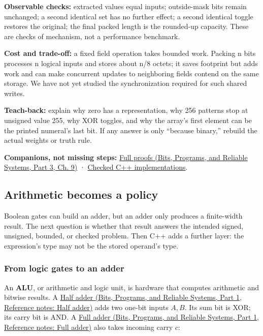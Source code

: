 \textbf{Observable checks:} extracted values equal inputs; outside-mask bits remain unchanged; a second identical set has no further effect; a second identical toggle restores the original; the final packed length is the rounded-up capacity. These are checks of mechanism, not a performance benchmark.

\textbf{Cost and trade-off:} a fixed field operation takes bounded work. Packing n bits processes n logical inputs and stores about n/8 octets; it saves footprint but adds work and can make concurrent updates to neighboring fields contend on the same storage. We have not yet studied the synchronization required for such shared writes.

\textbf{Teach-back:} explain why zero has a representation, why 256 patterns stop at unsigned value 255, why XOR toggles, and why the array's first element can be the printed numeral's last bit. If any answer is only ``because binary,'' rebuild the actual weights or truth rule.

\textbf{Companions, not missing steps:} \href{../01-Bits-Programs-and-Reliable-Systems-P03/main.pdf\#nameddest=01-foundations-i-ch011-m001---positional-value-masks-fields-and-de-morgan}{Full proofs (Bits, Programs, and Reliable Systems, Part 3, Ch. 9)} · \hyperref[appendix-4e2236f53445-m001---width-safe-fields-and-lsb-first-bit-packing]{Checked C++ implementations}.

\subsection{Arithmetic becomes a policy}\label{05-engine-i-ch001-arithmetic-becomes-a-policy}

\hypertarget{05-engine-i-ch001-arithmetic-becomes-a-policy}{}

Boolean gates can build an adder, but an adder only produces a finite-width result. The next question is whether that result answers the intended signed, unsigned, bounded, or checked problem. Then C++ adds a further layer: the expression's type may not be the stored operand's type.

\subsubsection{From logic gates to an adder}\label{05-engine-i-ch001-from-logic-gates-to-an-adder}

\hypertarget{05-engine-i-ch001-from-logic-gates-to-an-adder}{}

An \textbf{ALU}, or arithmetic and logic unit, is hardware that computes arithmetic and bitwise results. A \href{../01-Bits-Programs-and-Reliable-Systems-P01/main.pdf\#nameddest=appendix-1652d27a8e90}{Half adder (Bits, Programs, and Reliable Systems, Part 1, Reference notes: Half adder)} adds two one-bit inputs \(A,B\). Its sum bit is XOR; its carry bit is AND. A \href{../01-Bits-Programs-and-Reliable-Systems-P01/main.pdf\#nameddest=appendix-d1a5b1e520c2}{Full adder (Bits, Programs, and Reliable Systems, Part 1, Reference notes: Full adder)} also takes incoming carry \(c\):

